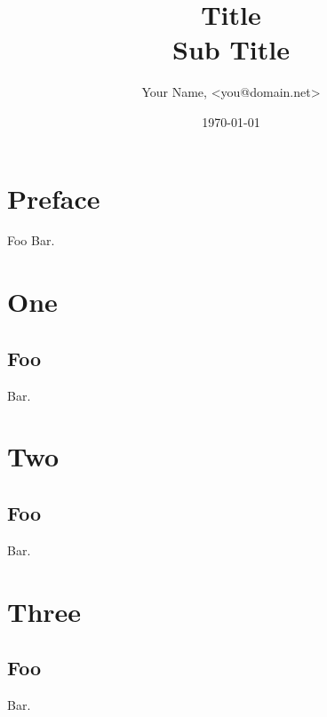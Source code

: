 \documentclass[
  pagesize,               %
  a4paper,                %
  BCOR13mm,               %
  twoside,                %
  1headlines,             %
  1footlines,             %
  chapterprefix,
  fleqn
]{scrbook}
\title{Title \\ Sub Title}
\author{Your Name, <you@domain.net>}
\date{\today}
\begin{document}
\frontmatter

\maketitle

\setcounter{page}{0}

\tableofcontents

\chapter{Preface}

Foo Bar.

\mainmatter

\chapter{One}
\label{cha:one}

\section{Foo}
\label{sec:foo}

Bar.

\chapter{Two}
\label{cha:two}

\section{Foo}
\label{sec:foo}

Bar.

\chapter{Three}
\label{cha:three}

\section{Foo}
\label{sec:foo}

Bar.
\end{document}

